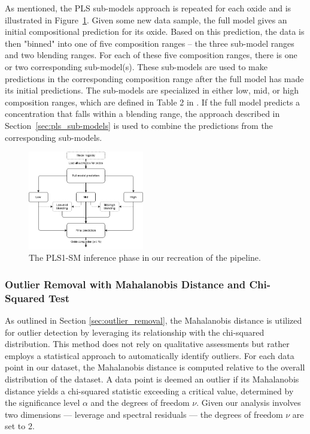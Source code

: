 As mentioned, the PLS sub-models approach is repeated for each oxide and is illustrated in Figure~\ref{fig:pls_inference}.
Given some new data sample, the full model gives an initial compositional prediction for its oxide.
Based on this prediction, the data is then "binned" into one of five composition ranges -- the three sub-model ranges and two blending ranges.
For each of these five composition ranges, there is one or two corresponding sub-model(s).
These sub-models are used to make predictions in the corresponding composition range after the full model has made its initial predictions.
The sub-models are specialized in either low, mid, or high composition ranges, which are defined in Table 2 in \citet{andersonImprovedAccuracyQuantitative2017}.
If the full model predicts a concentration that falls within a blending range, the approach described in Section~\ref{sec:pls_sub-models} is used to combine the predictions from the corresponding sub-models.

\begin{figure}
	\centering
	\includegraphics[width=0.45\textwidth]{images/pls_inference.png}
	\caption{The PLS1-SM inference phase in our recreation of the pipeline.}
	\label{fig:pls_inference}
\end{figure}

\subsubsection{Outlier Removal with Mahalanobis Distance and Chi-Squared Test}\label{sec:methodology_outlier_removal}
As outlined in Section \ref{sec:outlier_removal}, the Mahalanobis distance is utilized for outlier detection by leveraging its relationship with the chi-squared distribution.
This method does not rely on qualitative assessments but rather employs a statistical approach to automatically identify outliers.
For each data point in our dataset, the Mahalanobis distance is computed relative to the overall distribution of the dataset.
A data point is deemed an outlier if its Mahalanobis distance yields a chi-squared statistic exceeding a critical value, determined by the significance level $\alpha$ and the degrees of freedom $\nu$.
Given our analysis involves two dimensions --- leverage and spectral residuals --- the degrees of freedom $\nu$ are set to 2.

